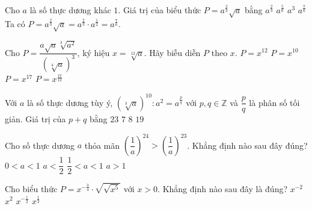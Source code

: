 \begin{ex}%
	Cho $a$ là số thực dương khác $1$. Giá trị của biểu thức $P=a^{\tfrac{2}{3}} \sqrt{a}$ bằng
	\choice
	{$a^{\tfrac{2}{3}}$}
	{$a^{\tfrac{5}{6}}$}
	{$a^3$}
	{\True $a^{\tfrac{7}{6}}$}
	\loigiai
	{
		Ta có $P=a^{\tfrac{2}{3}} \sqrt{a}=a^{\tfrac{2}{3}} \cdot a^{\tfrac{1}{2}}=a^{\tfrac{7}{6}}$.
	}
\end{ex}


\begin{ex}%
	Cho $P=\dfrac{a \sqrt{a} \sqrt[3]{a^2}}{(\sqrt[4]{a})^3}$, ký hiệu $x=\sqrt[12]{a}$. Hãy biễu diễn $P$ theo $x$.
	\choice
	{$P=x^{12}$}
	{$P=x^{10}$}
	{\True $P=x^{17}$}
	{$P=x^{\tfrac{17}{12}}$}
\end{ex}

\begin{ex}%
	Với $a$ là số thực dương tùy ý, $(\sqrt[3]{a})^{10}: a^2=a^{\tfrac{p}{q}}$ với $p, q \in \mathbb{Z}$ và $\dfrac{p}{q}$ là phân số tối giản. Giá trị của $p+q$ bằng
	\choice
	{$23$}
	{\True $7$}
	{$8$}
	{$19$}
\end{ex}
\begin{ex}%
	Cho số thực dương $a$ thỏa mãn $\left( \dfrac{1}{a}\right)^{24}>\left( \dfrac{1}{a}\right)^{23} $. Khẳng định nào sau đây đúng?
	\choice
	{\True $0<a<1$}
	{$a<\dfrac{1}{2}$}
	{$\dfrac{1}{2}<a<1$}
	{$a>1$}
	
\end{ex}


\begin{ex}%
	Cho biểu thức $P=x^{-\tfrac{3}{4}}\cdot\sqrt{\sqrt{x^5}}$ với $x>0$. Khẳng định nào sau đây là đúng?
	\choice
	{$x^{-2}$}
	{$x^2$}
	{$x^{-\tfrac{1}{2}}$}
	{\True $x^{\tfrac{1}{2}}$}
	
\end{ex}



